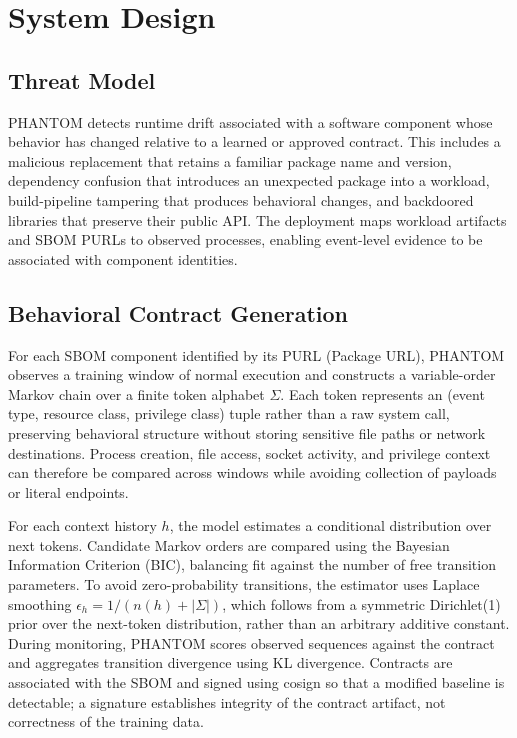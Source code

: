 \documentclass[conference]{IEEEtran}
\begin{document}
\section{System Design}
\subsection{Threat Model}
PHANTOM detects runtime drift associated with a software component whose behavior has changed relative to a learned or approved contract. This includes a malicious replacement that retains a familiar package name and version, dependency confusion that introduces an unexpected package into a workload, build-pipeline tampering that produces behavioral changes, and backdoored libraries that preserve their public API. The deployment maps workload artifacts and SBOM PURLs to observed processes, enabling event-level evidence to be associated with component identities.



\subsection{Behavioral Contract Generation}
For each SBOM component identified by its PURL (Package URL), PHANTOM observes a training window of normal execution and constructs a variable-order Markov chain over a finite token alphabet $\Sigma$. Each token represents an (event type, resource class, privilege class) tuple rather than a raw system call, preserving behavioral structure without storing sensitive file paths or network destinations. Process creation, file access, socket activity, and privilege context can therefore be compared across windows while avoiding collection of payloads or literal endpoints.

For each context history $h$, the model estimates a conditional distribution over next tokens. Candidate Markov orders are compared using the Bayesian Information Criterion (BIC), balancing fit against the number of free transition parameters. To avoid zero-probability transitions, the estimator uses Laplace smoothing $\epsilon_h=1/(n(h)+|\Sigma|)$, which follows from a symmetric Dirichlet(1) prior over the next-token distribution, rather than an arbitrary additive constant. During monitoring, PHANTOM scores observed sequences against the contract and aggregates transition divergence using KL divergence. Contracts are associated with the SBOM and signed using cosign so that a modified baseline is detectable; a signature establishes integrity of the contract artifact, not correctness of the training data.
\end{document}
